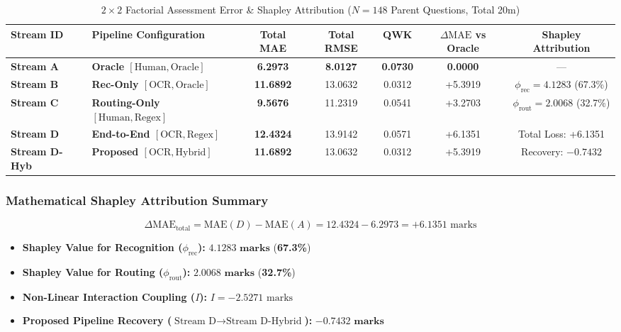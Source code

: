 \documentclass[journal]{IEEEtran}
\begin{document}
\begin{table}[t]
\centering
\caption{$2\times 2$ Factorial Assessment Error \& Shapley Attribution ($N = 148$ Parent Questions, Total 20m)}
\label{tab:factorial_summary}
\begin{tabular}{llccccc}
\toprule
\textbf{Stream ID} & \textbf{Pipeline Configuration} & \textbf{Total MAE} & \textbf{Total RMSE} & \textbf{QWK} & \textbf{$\Delta\text{MAE}$ vs Oracle} & \textbf{Shapley Attribution} \\
\midrule
\textbf{Stream A} & \textbf{Oracle $[\text{Human}, \text{Oracle}]$} & \textbf{6.2973} & \textbf{8.0127} & \textbf{0.0730} & \textbf{0.0000} & --- \\
\textbf{Stream B} & \textbf{Rec-Only $[\text{OCR}, \text{Oracle}]$} & \textbf{11.6892} & 13.0632 & 0.0312 & +5.3919 & $\phi_{\text{rec}} = 4.1283$ (67.3\%) \\
\textbf{Stream C} & \textbf{Routing-Only $[\text{Human}, \text{Regex}]$} & \textbf{9.5676} & 11.2319 & 0.0541 & +3.2703 & $\phi_{\text{rout}} = 2.0068$ (32.7\%) \\
\textbf{Stream D} & \textbf{End-to-End $[\text{OCR}, \text{Regex}]$} & \textbf{12.4324} & 13.9142 & 0.0571 & +6.1351 & Total Loss: +6.1351 \\
\textbf{Stream D-Hyb} & \textbf{Proposed $[\text{OCR}, \text{Hybrid}]$} & \textbf{11.6892} & 13.0632 & 0.0312 & +5.3919 & Recovery: $-0.7432$ \\
\bottomrule
\end{tabular}
\end{table}

\subsubsection{Mathematical Shapley Attribution Summary}
$$\Delta\text{MAE}_{\text{total}} = \text{MAE}(D) - \text{MAE}(A) = 12.4324 - 6.2973 = +6.1351\text{ marks}$$
\begin{itemize}
    \item \textbf{Shapley Value for Recognition ($\phi_{\text{rec}}$):} $\mathbf{4.1283\text{ marks}}$ (\textbf{67.3\%})
    \item \textbf{Shapley Value for Routing ($\phi_{\text{rout}}$):} $\mathbf{2.0068\text{ marks}}$ (\textbf{32.7\%})
    \item \textbf{Non-Linear Interaction Coupling ($I$):} $I = -2.5271\text{ marks}$
    \item \textbf{Proposed Pipeline Recovery ($\text{Stream D} \to \text{Stream D-Hybrid}$):} $\mathbf{-0.7432\text{ marks}}$
\end{itemize}
\end{document}
